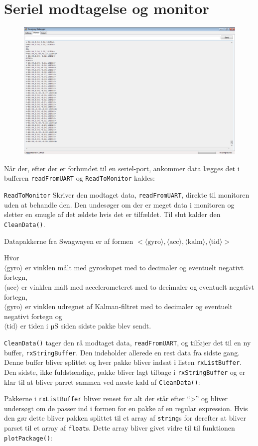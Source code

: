 \documentclass[a4paper,oneside,article,danish,table]{memoir}
\newcommand{\form}[2]{}
\begin{document}
\section{Seriel modtagelse og monitor}
\begin{figure}[htbp]
  \centering
  \includegraphics[width=1\textwidth]{monitor.png}
\end{figure}
Når der, efter der er forbundet til en seriel-port, ankommer data lægges det i bufferen \texttt{readFromUART} og \texttt{ReadToMonitor} kaldes:
\form{131}{136}
\texttt{ReadToMonitor} Skriver den modtaget data, \texttt{readFromUART}, direkte til monitoren uden at behandle den. Den undesøger om der er meget data i monitoren og sletter en smugle af det ældste hvis det er tilfældet. Til slut kalder den \texttt{CleanData()}.
\form{138}{149}
Datapakkerne fra Swagwayen er af formen $<\langle \text{gyro} \rangle,\langle \text{acc} \rangle,\langle \text{kalm} \rangle,\langle \text{tid} \rangle>$
\begin{tabbing}
H\=vor\\
\> $\langle \text{gyro} \rangle$ er vinklen målt med gyroskopet med to decimaler og eventuelt negativt fortegn,\\
\> $\langle \text{acc} \rangle$ er vinklen målt med accelerometeret med to decimaler og eventuelt negativt fortegn,\\
\> $\langle \text{gyro} \rangle$ er vinklen udregnet af Kalman-filtret med to decimaler og eventuelt negativt fortegn og\\
\> $\langle \text{tid} \rangle$ er tiden i \si{µS} siden sidste pakke blev sendt.
\end{tabbing}
\texttt{CleanData()} tager den rå modtaget data, \texttt{readFromUART}, og tilføjer det til en ny buffer, \texttt{rxStringBuffer}. Den indeholder allerede en rest data fra sidste gang. Denne buffer bliver splittet og hver pakke bliver indsat i listen \texttt{rxListBuffer}. Den sidste, ikke fuldstændige, pakke bliver lagt tilbage i \texttt{rxStringBuffer} og er klar til at bliver parret sammen ved næste kald af \texttt{CleanData()}:
\form{151}{157}
Pakkerne i \texttt{rxListBuffer} bliver renset for alt der står efter “>” og bliver undersøgt om de passer ind i formen for en pakke af en regular expression. Hvis den gør dette bliver pakken splittet til et array af \texttt{string}s for derefter at bliver parset til et array af \texttt{float}s. Dette array bliver givet vidre til til funktionen \texttt{plotPackage()}:
\form{159}{189}
\end{document}
